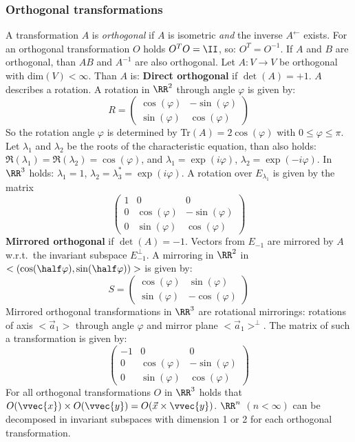 \subsubsection{Orthogonal transformations}
A transformation $A$ is {\it orthogonal} if $A$ is isometric {\it and}
the inverse $A^\leftarrow$ exists. For an orthogonal transformation $O$ holds
$O^TO=\II$, so: $O^T=O^{-1}$. If $A$ and $B$ are orthogonal, than $AB$ and
$A^{-1}$ are also orthogonal.
\npar
Let $A:V\rightarrow V$ be orthogonal with dim$(V)<\infty$. Than $A$ is:
\npar
{\bf Direct orthogonal} if $\det(A)=+1$. $A$ describes a rotation.
A rotation in $\RR^2$ through angle $\varphi$ is given by:
\[
R=
\left(\begin{array}{cc}
\cos(\varphi)&-\sin(\varphi)\\
\sin(\varphi)&\cos(\varphi)
\end{array}\right)
\]
So the rotation angle $\varphi$ is determined by Tr$(A)=2\cos(\varphi)$
with $0\leq\varphi\leq\pi$. Let $\lambda_1$ and $\lambda_2$ be the roots of
the characteristic equation, than also holds:
$\Re(\lambda_1)=\Re(\lambda_2)=\cos(\varphi)$, and $\lambda_1=\exp(i\varphi)$,
$\lambda_2=\exp(-i\varphi)$.
\npar
In $\RR^3$ holds: $\lambda_1=1$, $\lambda_2=\lambda_3^*=\exp(i\varphi)$. A
rotation over $E_{\lambda_1}$ is given by the matrix
\[
\left(\begin{array}{ccc}
1&0&0\\
0&\cos(\varphi)&-\sin(\varphi)\\
0&\sin(\varphi)&\cos(\varphi)
\end{array}\right)
\]
{\bf Mirrored orthogonal} if $\det(A)=-1$. Vectors from $E_{-1}$ are mirrored
by $A$ w.r.t.\ the invariant subspace $E^\perp_{-1}$. A mirroring in $\RR^2$
in $<(\cos(\half\varphi),\sin(\half\varphi))>$ is given by:
\[
S=
\left(\begin{array}{cc}
\cos(\varphi)&\sin(\varphi)\\
\sin(\varphi)&-\cos(\varphi)
\end{array}\right)
\]
Mirrored orthogonal transformations in $\RR^3$ are rotational mirrorings:
rotations of axis $<\vec{a}_1>$ through angle $\varphi$ and mirror plane
$<\vec{a}_1>^\perp$. The matrix of such a transformation is given by:
\[
\left(\begin{array}{ccc}
-1&0&0\\
0&\cos(\varphi)&-\sin(\varphi)\\
0&\sin(\varphi)&\cos(\varphi)
\end{array}\right)
\]
For all orthogonal transformations $O$ in $\RR^3$ holds that
$O(\vvec{x})\times O(\vvec{y})=O(\vec{x}\times\vvec{y})$.
\npar
$\RR^n$ $(n<\infty)$ can be decomposed in invariant subspaces with dimension
1 or 2 for each orthogonal transformation.

